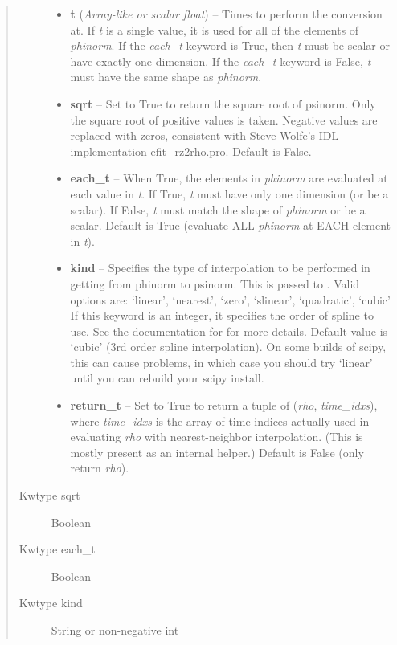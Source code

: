 \documentclass[letterpaper,10pt,english]{sphinxmanual}
\begin{document}
\begin{fulllineitems}
\begin{fulllineitems}
\begin{quote}
\begin{description}
\begin{itemize}
\item {} 
\textbf{t} (\emph{Array-like or scalar float}) -- Times to perform the conversion at.
If \emph{t} is a single value, it is used for all of the elements of
\emph{phinorm}. If the \emph{each\_t} keyword is True, then \emph{t} must be scalar
or have exactly one dimension. If the \emph{each\_t} keyword is False,
\emph{t} must have the same shape as \emph{phinorm}.

\item {} 
\textbf{sqrt} -- Set to True to return the square root of psinorm.
Only the square root of positive values is taken. Negative
values are replaced with zeros, consistent with Steve Wolfe's
IDL implementation efit\_rz2rho.pro. Default is False.

\item {} 
\textbf{each\_t} -- When True, the elements in \emph{phinorm} are evaluated
at each value in \emph{t}. If True, \emph{t} must have only one dimension
(or be a scalar). If False, \emph{t} must match the shape of \emph{phinorm}
or be a scalar. Default is True (evaluate ALL \emph{phinorm} at EACH
element in \emph{t}).

\item {} 
\textbf{kind} -- Specifies the type of
interpolation to be performed in getting from phinorm to
psinorm. This is passed to
. Valid options are:
`linear', `nearest', `zero', `slinear', `quadratic', `cubic'
If this keyword is an integer, it specifies the order of spline
to use. See the documentation for  for more
details. Default value is `cubic' (3rd order spline
interpolation). On some builds of scipy, this can cause problems,
in which case you should try `linear' until you can rebuild your
scipy install.

\item {} 
\textbf{return\_t} -- Set to True to return a tuple of (\emph{rho},
\emph{time\_idxs}), where \emph{time\_idxs} is the array of time indices
actually used in evaluating \emph{rho} with nearest-neighbor
interpolation. (This is mostly present as an internal helper.)
Default is False (only return \emph{rho}).

\end{itemize}

\item[{Kwtype sqrt}] \leavevmode
Boolean

\item[{Kwtype each\_t}] \leavevmode
Boolean

\item[{Kwtype kind}] \leavevmode
String or non-negative int


\end{description}
\end{quote}
\end{fulllineitems}
\end{fulllineitems}
\end{document}
